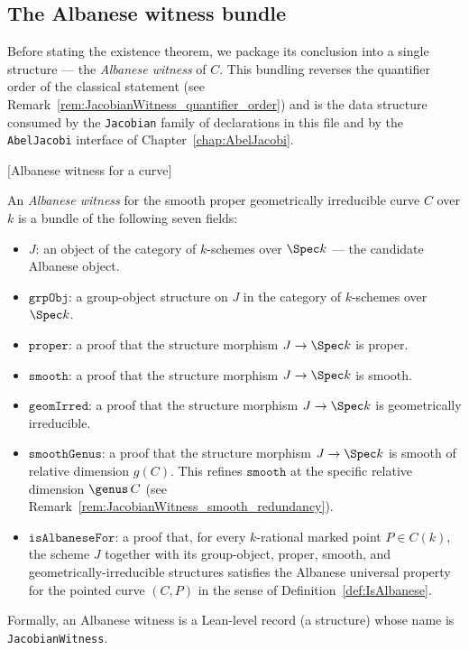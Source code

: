 \subsection{The Albanese witness bundle}
Before stating the existence theorem, we package its conclusion into a single structure --- the \emph{Albanese witness} of \(C\). This bundling reverses the quantifier order of the classical statement (see Remark~\ref{rem:JacobianWitness_quantifier_order}) and is the data structure consumed by the \texttt{Jacobian} family of declarations in this file and by the \texttt{AbelJacobi} interface of Chapter~\ref{chap:AbelJacobi}.
\begin{definition}
\leanok
[Albanese witness for a curve]
  \label{def:JacobianWitness}
  
  An \emph{Albanese witness} for the smooth proper geometrically irreducible curve \(C\) over \(k\) is a bundle of the following seven fields:
  \begin{itemize}
    \item \(J\): an object of the category of \(k\)-schemes over \(\Spec k\) --- the candidate Albanese object.
    \item \(\mathtt{grpObj}\): a group-object structure on \(J\) in the category of \(k\)-schemes over \(\Spec k\).
    \item \(\mathtt{proper}\): a proof that the structure morphism \(J \to \Spec k\) is proper.
    \item \(\mathtt{smooth}\): a proof that the structure morphism \(J \to \Spec k\) is smooth.
    \item \(\mathtt{geomIrred}\): a proof that the structure morphism \(J \to \Spec k\) is geometrically irreducible.
    \item \(\mathtt{smoothGenus}\): a proof that the structure morphism \(J \to \Spec k\) is smooth of relative dimension \(g(C)\). This refines \(\mathtt{smooth}\) at the specific relative dimension \(\genus\, C\) (see Remark~\ref{rem:JacobianWitness_smooth_redundancy}).
    \item \(\mathtt{isAlbaneseFor}\): a proof that, for every \(k\)-rational marked point \(P \in C(k)\), the scheme \(J\) together with its group-object, proper, smooth, and geometrically-irreducible structures satisfies the Albanese universal property for the pointed curve \((C, P)\) in the sense of Definition~\ref{def:IsAlbanese}.
  \end{itemize}
  Formally, an Albanese witness is a Lean-level record (a structure) whose name is \texttt{JacobianWitness}.
\end{definition}
